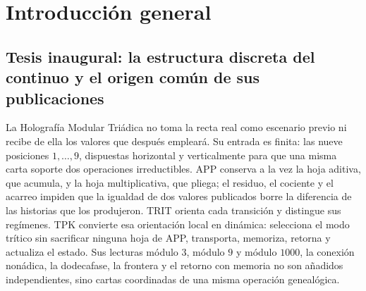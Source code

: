 \chapter*{Introducción general}
\label{chap:introduccion-general-83}

%
%

\ifdefined\HMTSucesoraStructureTrace
\fi

\section*{Tesis inaugural: la estructura discreta del continuo y el origen común de sus publicaciones}
\label{sec:tesis-inaugural-helicoidal-hmt-md}

La Holografía Modular Triádica no toma la recta real como escenario previo ni
recibe de ella los valores que después empleará. Su entrada es finita: las
nueve posiciones \(1,\ldots,9\), dispuestas horizontal y verticalmente para
que una misma carta soporte dos operaciones irreductibles. APP conserva a la
vez la hoja aditiva, que acumula, y la hoja multiplicativa, que pliega; el
residuo, el cociente y el acarreo impiden que la igualdad de dos valores
publicados borre la diferencia de las historias que los produjeron. TRIT
orienta cada transición y distingue sus regímenes. TPK convierte esa
orientación local en dinámica: selecciona el modo trítico sin sacrificar
ninguna hoja de APP, transporta, memoriza, retorna y actualiza el estado. Sus
lecturas módulo \(3\), módulo \(9\) y módulo \(1000\), la conexión nonádica,
la dodecafase, la frontera y el retorno con memoria no son añadidos
independientes, sino cartas coordinadas de una misma operación genealógica.

